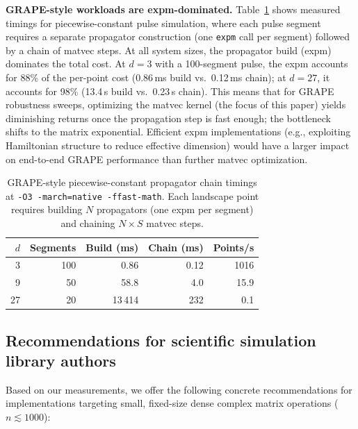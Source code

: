 \documentclass[final,3p,times,twocolumn]{elsarticle}
\begin{document}
\textbf{GRAPE-style workloads are expm-dominated.}
Table~\ref{tab:grape} shows measured timings for piecewise-constant
pulse simulation, where each pulse segment requires a separate propagator
construction (one \texttt{expm} call per segment) followed by a chain of
matvec steps. At all system sizes, the propagator build (expm) dominates
the total cost. At $d = 3$ with a 100-segment pulse, the expm accounts
for 88\% of the per-point cost (0.86\,ms build vs.\ 0.12\,ms chain); at
$d = 27$, it accounts for 98\% (13.4\,s build vs.\ 0.23\,s chain). This
means that for GRAPE robustness sweeps, optimizing the matvec kernel
(the focus of this paper) yields diminishing returns once the
propagation step is fast enough; the bottleneck shifts to the matrix
exponential. Efficient expm implementations (e.g., exploiting Hamiltonian
structure to reduce effective dimension) would have a larger impact on
end-to-end GRAPE performance than further matvec optimization.

\begin{table}[t]
  \centering
  \caption{GRAPE-style piecewise-constant propagator chain timings at
           \texttt{-O3 -march=native -ffast-math}. Each landscape point
           requires building $N$ propagators (one expm per segment) and
           chaining $N \times S$ matvec steps.}
  \label{tab:grape}
  \begin{tabular}{@{}rrrrr@{}}
    \toprule
    $d$ & Segments & Build (ms) & Chain (ms) & Points/s \\
    \midrule
    3  & 100 & 0.86   & 0.12   & 1016 \\
    9  & 50  & 58.8   & 4.0    & 15.9 \\
    27 & 20  & 13\,414 & 232   & 0.1 \\
    \bottomrule
  \end{tabular}
\end{table}

\subsection{Recommendations for scientific simulation library authors}
\label{sec:recommendations}

Based on our measurements, we offer the following concrete recommendations
for implementations targeting small, fixed-size dense complex matrix
operations ($n \lesssim 1000$):
\end{document}
